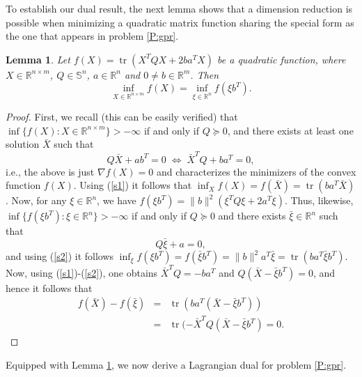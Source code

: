 \documentclass[12pt]{article}
\numberwithin{equation}{section}
\newtheorem{lemma}{Lemma}[section]
\theoremstyle{definition}
\theoremstyle{remark}
\DeclareMathOperator{\trace}{tr}
\def\real{\mathbb{R}}
\begin{document}
To establish our dual result, the next lemma shows that a dimension reduction is possible when
minimizing  a quadratic matrix function sharing the special form as the one that appears in
problem \eqref{P:gpr}.

\begin{lemma}\label{L:quadlemma}
Let $f(X)=\trace (X^T Q X + 2 ba^T X)$ be a quadratic function, where $X\in
\mathbb{R}^{n\times m}$, $Q\in \mathbb{S}^n$, $a\in \mathbb{R}^n$ and $0\neq b\in
\mathbb{R}^m$. Then
\[
    \inf_{X\in \mathbb{R}^{n\times m}} f(X) = \inf_{\xi\in \mathbb{R}^n} f(\xi b^T).
\]
\end{lemma}
\begin{proof}
First, we recall (this can be easily verified) that $\inf \{f(X): X \in \real^{n\times m}\}
>-\infty$ if and only if $Q \succeq 0$, and there exists at least one solution ${\bar X}$ such
that
\begin{equation}\label{s1}
 Q{\bar X}+ ab^T=0 \;
\Leftrightarrow\; {\bar X}^TQ +ba^T=0,
\end{equation}
i.e., the above is just $\nabla f (X)= 0$ and characterizes the minimizers of the convex
function $f(X)$. Using (\ref{s1}) it follows that $\inf_X f(X)=f({\bar X})=\trace (ba^T{\bar
X})$.
 Now, for any $\xi \in \mathbb{R}^n$, we have $f(\xi b^T)=\|b\|^2(\xi^TQ\xi + 2a^T\xi)$. Thus, likewise,
 $\inf\{f(\xi b^T): \xi \in \real^n\} >-\infty$ if and only if $Q \succeq 0$ and there exists ${\bar \xi}\in \real^n$ such
that \begin{equation}\label{s2} Q{\bar \xi} + a=0,\end{equation} and using (\ref{s2}) it
follows $\inf_\xi f(\xi b^T)=f({\bar \xi}b^T)=\|b\|^2a^T{\bar \xi}=\trace (ba^T{\bar
\xi}b^T)$. Now, using (\ref{s1})-(\ref{s2}), one obtains ${\bar X}^TQ=-ba^T$ and $Q({\bar X}-
{\bar \xi}b^T)=0$, and hence it follows that
\begin{eqnarray*}
f({\bar X})-f({\bar \xi})&=&\trace (ba^T({\bar X}- {\bar \xi}b^T))\\
                        &=&\trace (-{\bar X}^TQ({\bar X}- {\bar \xi}b^T)=0.
                        \end{eqnarray*}
\end{proof}

Equipped with Lemma \ref{L:quadlemma},  we now derive  a Lagrangian dual for problem
\eqref{P:gpr}.
\end{document}
